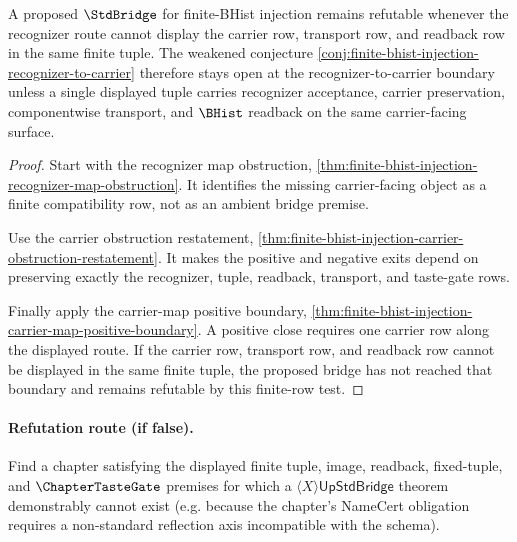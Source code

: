 \begin{theorem}
\label{thm:finite-bhist-injection-recognizer-rate-refutation}
A proposed $\StdBridge$ for finite-BHist injection remains refutable whenever the recognizer route cannot display the carrier row, transport row, and readback row in the same finite tuple. The weakened conjecture \autoref{conj:finite-bhist-injection-recognizer-to-carrier} therefore stays open at the recognizer-to-carrier boundary unless a single displayed tuple carries recognizer acceptance, carrier preservation, componentwise transport, and $\BHist$ readback on the same carrier-facing surface.
\end{theorem}
\begin{proof}
Start with the recognizer map obstruction, \autoref{thm:finite-bhist-injection-recognizer-map-obstruction}. It identifies the missing carrier-facing object as a finite compatibility row, not as an ambient bridge premise.

Use the carrier obstruction restatement, \autoref{thm:finite-bhist-injection-carrier-obstruction-restatement}. It makes the positive and negative exits depend on preserving exactly the recognizer, tuple, readback, transport, and taste-gate rows.

Finally apply the carrier-map positive boundary, \autoref{thm:finite-bhist-injection-carrier-map-positive-boundary}. A positive close requires one carrier row along the displayed route. If the carrier row, transport row, and readback row cannot be displayed in the same finite tuple, the proposed bridge has not reached that boundary and remains refutable by this finite-row test.
\end{proof}

\paragraph{Refutation route (if false).}
Find a chapter satisfying the displayed finite tuple, image, readback,
fixed-tuple, and $\ChapterTasteGate$ premises for which a
$\langle X\rangle\mathsf{UpStdBridge}$ theorem demonstrably cannot exist
(e.g. because the chapter's NameCert obligation requires a non-standard
reflection axis incompatible with the schema).
